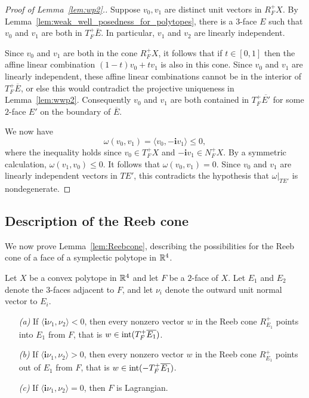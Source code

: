\begin{proof}[Proof of Lemma~\ref{lem:wp2}.]
Suppose $v_0,v_1$ are distinct unit vectors in $R_F^+X$. By Lemma~\ref{lem:weak_well_posedness_for_polytopes}, there is a $3$-face $E$ such that $v_0$ and $v_1$ are both in $T_F^+\bar{E}$. In particular, $v_1$ and $v_2$ are linearly independent.

Since $v_0$ and $v_1$ are both in the cone $R_F^+X$, it follows that if $t\in[0,1]$ then the affine linear combination $(1-t)v_0+tv_1$ is also in this cone. Since $v_0$ and $v_1$ are linearly independent, these affine linear combinations cannot be in the interior of $T_F^+\overline{E}$, or else this would contradict the projective uniqueness in Lemma~\ref{lem:wwp2}. Consequently $v_0$ and $v_1$ are both contained in $T_F^+\overline{E'}$ for some $2$-face $E'$ on the boundary of $\overline{E}$.

We now have
\[
\omega(v_0,v_1) = \langle v_0,-{\mathbf i}v_1\rangle \le 0,
\]
where the inequality holds since $v_0\in T_F^+X$ and $-{\mathbf i}v_1\in N_F^+X$. By a symmetric calculation, $\omega(v_1,v_0)\le 0$. It follows that $\omega(v_0,v_1)=0$. Since $v_0$ and $v_1$ are linearly independent vectors in $TE'$, this contradicts the hypothesis that $\omega|_{TE'}$ is nondegenerate.
\end{proof}

\subsection{Description of the Reeb cone}
\label{sec:drc}

We now prove Lemma~\ref{lem:Reebcone}, describing the possibilities for the Reeb cone of a face of a symplectic polytope in ${\mathbb R}^4$.

\begin{lemma}
\label{lem:EinEout}
Let $X$ be a convex polytope in ${\mathbb R}^4$ and let $F$ be a $2$-face of $X$. Let $E_1$ and $E_2$ denote the $3$-faces adjacent to $F$, and let $\nu_i$ denote the outward unit normal vector to $E_i$.
\begin{itemize}
	\item[\emph{(a)}] If $\langle {\mathbf i}\nu_{1},\nu_{2}\rangle < 0$, then every nonzero vector $w$ in the Reeb cone $R_{E_1}^+$ points into $E_1$ from $F$, that is $w\in \operatorname{int}(T_F^+\overline{E_1})$.
	\item[\emph{(b)}] If $\langle {\mathbf i}\nu_{1},\nu_{2}\rangle > 0$, then every nonzero vector $w$ in the Reeb cone $R_{E_1}^+$ points out of $E_1$ from $F$, that is $w\in \operatorname{int}(-T_F^+\overline{E_1})$.
	\item[\emph{(c)}] If $\langle {\mathbf i}\nu_{1},\nu_{2}\rangle = 0$, then $F$ is Lagrangian.
\end{itemize}
\end{lemma}

